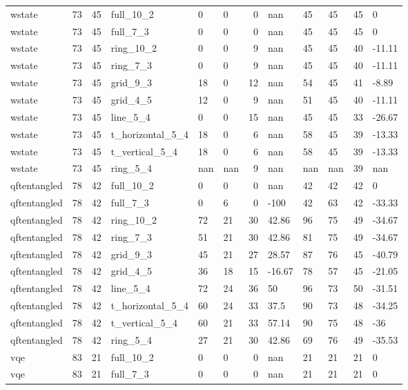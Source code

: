 \begin{longtable}{lrrlllrlllrl}
wstate & 73 & 45 & full\_10\_2 & 0 & 0 & 0 & nan & 45 & 45 & 45 & 0 \\
wstate & 73 & 45 & full\_7\_3 & 0 & 0 & 0 & nan & 45 & 45 & 45 & 0 \\
wstate & 73 & 45 & ring\_10\_2 & 0 & 0 & 9 & nan & 45 & 45 & 40 & -11.11 \\
wstate & 73 & 45 & ring\_7\_3 & 0 & 0 & 9 & nan & 45 & 45 & 40 & -11.11 \\
wstate & 73 & 45 & grid\_9\_3 & 18 & 0 & 12 & nan & 54 & 45 & 41 & -8.89 \\
wstate & 73 & 45 & grid\_4\_5 & 12 & 0 & 9 & nan & 51 & 45 & 40 & -11.11 \\
wstate & 73 & 45 & line\_5\_4 & 0 & 0 & 15 & nan & 45 & 45 & 33 & -26.67 \\
wstate & 73 & 45 & t\_horizontal\_5\_4 & 18 & 0 & 6 & nan & 58 & 45 & 39 & -13.33 \\
wstate & 73 & 45 & t\_vertical\_5\_4 & 18 & 0 & 6 & nan & 58 & 45 & 39 & -13.33 \\
wstate & 73 & 45 & ring\_5\_4 & nan & nan & 9 & nan & nan & nan & 39 & nan \\
qftentangled & 78 & 42 & full\_10\_2 & 0 & 0 & 0 & nan & 42 & 42 & 42 & 0 \\
qftentangled & 78 & 42 & full\_7\_3 & 0 & 6 & 0 & -100 & 42 & 63 & 42 & -33.33 \\
qftentangled & 78 & 42 & ring\_10\_2 & 72 & 21 & 30 & 42.86 & 96 & 75 & 49 & -34.67 \\
qftentangled & 78 & 42 & ring\_7\_3 & 51 & 21 & 30 & 42.86 & 81 & 75 & 49 & -34.67 \\
qftentangled & 78 & 42 & grid\_9\_3 & 45 & 21 & 27 & 28.57 & 87 & 76 & 45 & -40.79 \\
qftentangled & 78 & 42 & grid\_4\_5 & 36 & 18 & 15 & -16.67 & 78 & 57 & 45 & -21.05 \\
qftentangled & 78 & 42 & line\_5\_4 & 72 & 24 & 36 & 50 & 96 & 73 & 50 & -31.51 \\
qftentangled & 78 & 42 & t\_horizontal\_5\_4 & 60 & 24 & 33 & 37.5 & 90 & 73 & 48 & -34.25 \\
qftentangled & 78 & 42 & t\_vertical\_5\_4 & 60 & 21 & 33 & 57.14 & 90 & 75 & 48 & -36 \\
qftentangled & 78 & 42 & ring\_5\_4 & 27 & 21 & 30 & 42.86 & 69 & 76 & 49 & -35.53 \\
vqe & 83 & 21 & full\_10\_2 & 0 & 0 & 0 & nan & 21 & 21 & 21 & 0 \\
vqe & 83 & 21 & full\_7\_3 & 0 & 0 & 0 & nan & 21 & 21 & 21 & 0 \\

\end{longtable}
